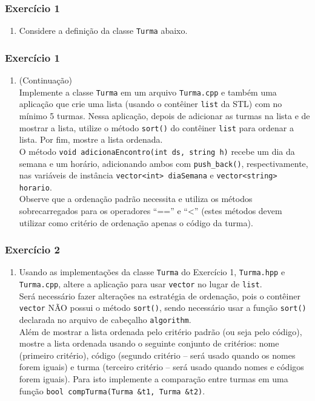\documentclass[xcolor={dvipsnames,table},aspectratio=169]{beamer}
\newcommand\setItemnumber[1]{\setcounter{enumi}{\numexpr#1-1\relax}}
\begin{document}
\begin{frame}[fragile]\frametitle{Exercício 1}
\begin{enumerate}
	\setItemnumber{1}
	\item Considere a definição da classe \texttt{Turma} abaixo.

\end{enumerate}
\end{frame}

\begin{frame}[fragile]\frametitle{Exercício 1}
\begin{enumerate}
	\setItemnumber{1}
	\item (Continuação)\\
	Implemente a classe \texttt{Turma} em um arquivo \texttt{Turma.cpp} e também uma aplicação que crie uma lista (usando o contêiner \texttt{list} da STL) com no mínimo 5 turmas. Nessa aplicação, depois de adicionar as turmas na lista e de mostrar a lista, utilize o método \texttt{sort()} do contêiner \texttt{list} para ordenar a lista. Por fim, mostre a lista ordenada.\\
O método \texttt{void adicionaEncontro(int ds, string h)} recebe um dia da semana e um horário, adicionando ambos com \texttt{push\_back()}, respectivamente, nas variáveis de instância 
\texttt{vector<int> diaSemana} e \texttt{vector<string> horario}.\\
Observe que a ordenação padrão necessita e utiliza os métodos sobrecarregados para os operadores ``=='' e ``<'' (estes métodos devem utilizar como critério de ordenação apenas o código da turma).
\end{enumerate}
\end{frame}

\begin{frame}[fragile]\frametitle{Exercício 2}
\begin{enumerate}
	\setItemnumber{2}
	\item Usando as implementações da classe \texttt{Turma} do Exercício 1, \texttt{Turma.hpp} e \texttt{Turma.cpp}, altere a aplicação para usar \texttt{vector} no lugar de \texttt{list}.\\
Será necessário fazer alterações na estratégia de ordenação, pois o contêiner \texttt{vector} NÃO possui o método \texttt{sort()}, sendo necessário usar a função \texttt{sort()} declarada no arquivo de cabeçalho \texttt{algorithm}.\\
Além de mostrar a lista ordenada pelo critério padrão (ou seja pelo código), mostre a lista ordenada usando o seguinte conjunto de critérios: nome (primeiro critério), código (segundo critério -- será usado quando os nomes forem iguais) e turma (terceiro critério -- será usado quando nomes e códigos forem iguais). Para isto implemente a comparação entre turmas em uma função \texttt{bool compTurma(Turma \&t1, Turma \&t2)}.
\end{enumerate}
\end{frame}
\end{document}
